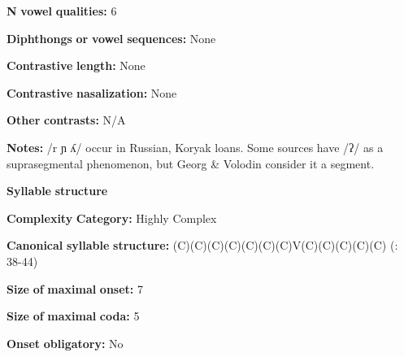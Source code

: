 \begin{styleBody}
\textbf{N} \textbf{vowel} \textbf{qualities:} 6
\end{styleBody}

\begin{styleBody}
\textbf{Diphthongs} \textbf{or} \textbf{vowel} \textbf{sequences:} None
\end{styleBody}

\begin{styleBody}
\textbf{Contrastive} \textbf{length:} None
\end{styleBody}

\begin{styleBody}
\textbf{Contrastive} \textbf{nasalization:} None
\end{styleBody}

\begin{styleBody}
\textbf{Other} \textbf{contrasts:} N/A
\end{styleBody}

\begin{styleBody}
\textbf{Notes:} /r ɲ ʎ/ occur in Russian, Koryak loans. Some sources have /ʔ/ as a suprasegmental phenomenon, but Georg \& Volodin consider it a segment. 
\end{styleBody}

\begin{styleBody}
\textbf{Syllable} \textbf{structure}
\end{styleBody}

\begin{styleBody}
\textbf{Complexity} \textbf{Category:} Highly Complex
\end{styleBody}

\begin{styleBody}
\textbf{Canonical} \textbf{syllable} \textbf{structure:} (C)(C)(C)(C)(C)(C)(C)V(C)(C)(C)(C)(C) (\citealt{GeorgVolodin1999}: 38-44)
\end{styleBody}

\begin{styleBody}
\textbf{Size} \textbf{of} \textbf{maximal} \textbf{onset:} 7
\end{styleBody}

\begin{styleBody}
\textbf{Size} \textbf{of} \textbf{maximal} \textbf{coda:} 5
\end{styleBody}

\begin{styleBody}
\textbf{Onset} \textbf{obligatory:} No
\end{styleBody}

